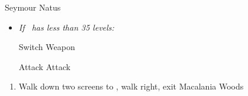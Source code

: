 \begin{battle}[36000]{Seymour Natus}
    \begin{itemize}
        \item \textit{If \lulu\ has less than 35 levels:}
        \begin{itemize}
            \switch{\tidus}{\lulu}
            \luluf Switch Weapon
            \switch{\lulu}{\tidus}
        \end{itemize}
        \tidusf Attack
        \summon{\bahamut}
        \bahamutf Attack
    \end{itemize}
\end{battle}
\begin{enumerate}[resume]
    \item Walk down two screens to \yuna, walk right, exit Macalania Woods
\end{enumerate}
